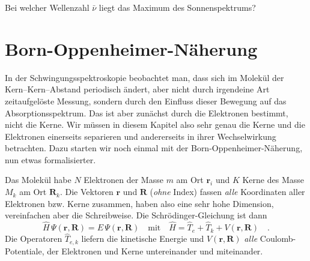 \begin{questions} 
\item Bei welcher Wellenzahl $\bar{\nu}$ liegt das Maximum des Sonnenspektrums?
\end{questions}

\section{Born-Oppenheimer-Näherung}

In der Schwingungsspektroskopie beobachtet man, dass sich im Molekül der Kern--Kern--Abstand  periodisch ändert, aber nicht durch irgendeine Art zeitaufgelöste Messung, sondern durch den Einfluss dieser Bewegung auf das Absorptionsspektrum. Das ist aber zunächst durch die Elektronen bestimmt, nicht die Kerne. Wir müssen in diesem Kapitel also sehr genau die Kerne und die Elektronen einerseits separieren und andererseits in ihrer Wechselwirkung betrachten. Dazu starten wir noch einmal mit der Born-Oppenheimer-Näherung, nun etwas formalisierter.

Das Molekül habe $N$ Elektronen der Masse $m$ am Ort $\mathbf{r}_i$ und $K$ Kerne des Masse $M_k$ am Ort $\mathbf{R}_k$. Die Vektoren $\mathbf{r}$ und $\mathbf{R}$ (\emph{ohne} Index) fassen \emph{alle} Koordinaten aller Elektronen bzw. Kerne zusammen, haben also eine sehr hohe Dimension, vereinfachen aber die Schreibweise. Die Schrödinger-Gleichung ist dann
\begin{equation}
 \hat{H} \, \Psi (\mathbf{r}, \mathbf{R}) = E \, \Psi (\mathbf{r}, \mathbf{R}) \quad \text{mit} \quad
  \hat{H} =  \hat{T}_e + \hat{T}_k + V (\mathbf{r}, \mathbf{R})  \quad .
  \label{eq:vib_SG_allg}
\end{equation}
Die Operatoren $\hat{T}_{e,k}$ liefern die kinetische Energie und  $ V (\mathbf{r}, \mathbf{R}) $ \emph{alle} Coulomb-Potentiale, der Elektronen und Kerne untereinander und miteinander.


